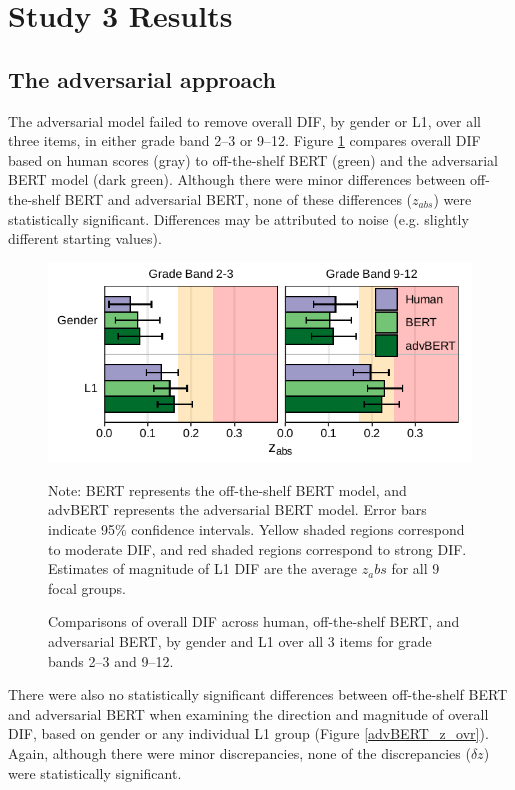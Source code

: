 \documentclass [PhD] {uclathes}
\begin{document}
\section{Study 3 Results}

\subsection{The adversarial approach}

The adversarial model failed to remove overall DIF, by gender or L1, over all three items, in either grade band 2–3 or 9–12. Figure \ref{advBERT_zabs_ovr} compares overall DIF based on human scores (gray) to off-the-shelf BERT (green) and the adversarial BERT model (dark green). Although there were minor differences between off-the-shelf BERT and adversarial BERT, none of these differences ($z_{abs}$) were statistically significant. Differences may be attributed to noise (e.g. slightly different starting values). 

\begin{figure}[h]
    \centering
    \caption{Comparisons of overall DIF across human, off-the-shelf BERT, and adversarial BERT, by gender and L1 over all 3 items for grade bands 2–3 and 9–12.}    
    \includegraphics[width=4.5in]{figures/20230517_ETS-DIF_advBERT_zabs_ovr_edit.pdf}
    \label{advBERT_zabs_ovr}
	{\newline Note: BERT represents the off-the-shelf BERT model, and advBERT represents the adversarial BERT model. Error bars indicate 95\% confidence intervals. Yellow shaded regions correspond to moderate DIF, and red shaded regions correspond to strong DIF. Estimates of magnitude of L1 DIF are the average $z_abs$ for all 9 focal groups. \par}
\end{figure}

There were also no statistically significant differences between off-the-shelf BERT and adversarial BERT when examining the direction and magnitude of overall DIF, based on gender or any individual L1 group (Figure \ref{advBERT_z_ovr}). Again, although there were minor discrepancies, none of the discrepancies ($\delta z$) were statistically significant.
\end{document}
